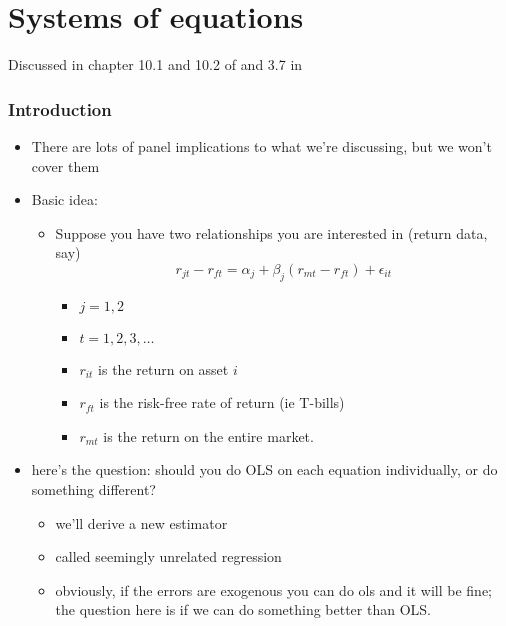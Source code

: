 

\part*{Systems of equations}%

Discussed in chapter 10.1 and 10.2 of \citet{Gre_2011} and 3.7 in
\citet{KlZ_2008}

\section{Introduction}

\begin{itemize}
\item There are lots of panel implications to what we're discussing,
      but we won't cover them
\item Basic idea:
\begin{itemize}
\item Suppose you have two relationships you are interested in
        (return data, say)
        \[r_{jt} - r_{ft} = \alpha_j + \beta_j (r_{mt} - r_{ft}) +
        \epsilon_{it}\]
\begin{itemize}
\item $j = 1,2$
\item $t = 1,2,3,\dots$
\item $r_{it}$ is the return on asset $i$
\item $r_{ft}$ is the risk-free rate of return (ie T-bills)
\item $r_{mt}$ is the return on the entire market.
\end{itemize}
\end{itemize}
\item here's the question: should you do OLS on each equation
      individually, or do something different?
\begin{itemize}
\item we'll derive a new estimator
\item called seemingly unrelated regression
\item obviously, if the errors are exogenous you can do ols and it
        will be fine; the question here is if we can do something
        better than OLS.
\end{itemize}
\end{itemize}

